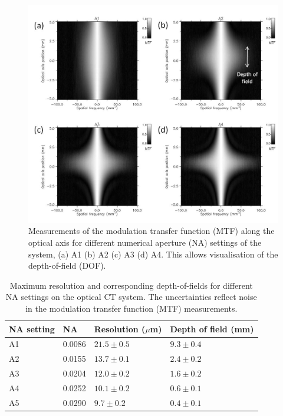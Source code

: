 	\begin{figure}[H]
		\centering
		\includegraphics[width=0.9\linewidth]{mrt_img/mrt_Fig6}
		\caption{Measurements of the modulation transfer function (MTF) along the optical axis for different numerical aperture (NA) settings of the system, (a) A1 (b) A2 (c) A3 (d) A4. This allows visualisation of the depth-of-field (DOF).}
		\label{fig:MTFDOF}
	\end{figure}
	
	\begin{table}[H]
		\centering
		\begin{tabular}{ p{2.5cm} p{1.8cm} p{3cm} p{3cm}  }
			\hline
			\textbf{NA setting} & \textbf{NA} & \textbf{Resolution ($\mu$m)} &\textbf{Depth of field (mm)}  \\ \hline
			A1  & 0.0086 & $21.5 \pm 0.5$ & $9.3 \pm 0.4$ \\ %
			A2  & 0.0155 & $13.7 \pm 0.1$ & $2.4 \pm 0.2$ \\ %
			A3  & 0.0204 & $12.0 \pm 0.2$ & $1.6 \pm 0.2$ \\ %
			A4  & 0.0252 & $10.1 \pm 0.2$ & $0.6 \pm 0.1$ \\ %
			A5  & 0.0290 & $9.7  \pm 0.2$ & $0.4 \pm 0.1$ \\ \hline		
		\end{tabular}
		\caption{Maximum resolution and corresponding depth-of-fields for different NA settings on the optical CT system. The uncertainties reflect noise in the modulation transfer function (MTF)  measurements.}
		\label{table:DOFNA}
	\end{table}





